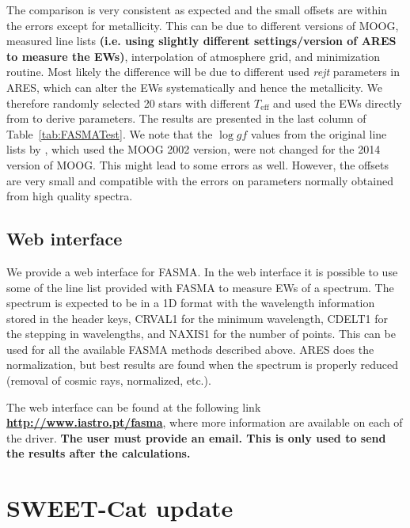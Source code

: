 \documentclass{aa}
\begin{document}
The comparison is very consistent as expected and the small offsets are within
the errors except for metallicity. This can be due to different versions of
MOOG, measured line lists {\bf (i.e. using slightly different settings/version
of ARES to measure the EWs)}, interpolation of atmosphere grid, and minimization
routine. Most likely the difference will be due to different used \emph{rejt}
parameters in ARES, which can alter the EWs systematically and hence the
metallicity. We therefore randomly selected 20 stars with different
$T_\mathrm{eff}$ and used the EWs directly from \citet{Sousa2011} to derive
parameters. The results are presented in the last column of
Table~\ref{tab:FASMATest}. We note that the $\log gf$ values from the original
line lists by \citet{Sousa2011}, which used the MOOG 2002 version, were not
changed for the 2014 version of MOOG. This might lead to some errors as well.
However, the offsets are very small and compatible with the errors on parameters
normally obtained from high quality spectra.


\subsection{Web interface}
\label{sub:Web interface}

We provide a web interface for FASMA. In the web interface it is possible to use
some of the line list provided with FASMA to measure EWs of a spectrum. The
spectrum is expected to be in a 1D format with the wavelength information stored
in the header keys, CRVAL1 for the minimum wavelength, CDELT1 for the stepping
in wavelengths, and NAXIS1 for the number of points. This can be used for all
the available FASMA methods described above. ARES does the normalization, but
best results are found when the spectrum is properly reduced (removal of cosmic
rays, normalized, etc.).

The web interface can be found at the following link
{\bf \url{http://www.iastro.pt/fasma}}, where more information are
available on each of the driver. {\bf The user must provide an email. This is
only used to send the results after the calculations.}


\section{SWEET-Cat update}
\end{document}
